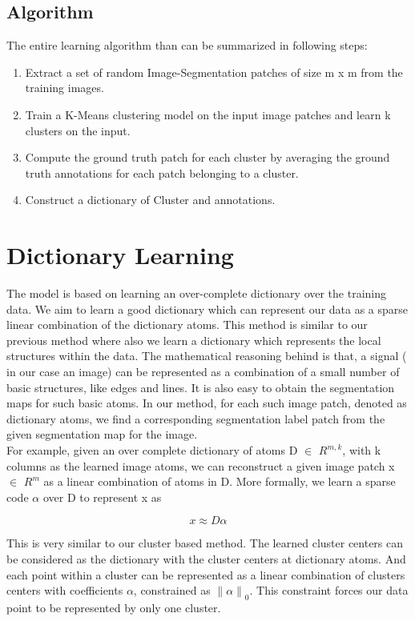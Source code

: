 \subsection{Algorithm}
The entire learning algorithm than can be summarized in following steps:
\begin{enumerate}
	\item Extract a set of random Image-Segmentation patches of size m x m from the training images.
	\item Train a K-Means clustering model on the input image patches and learn k clusters on the input.
	\item Compute the ground truth patch for each cluster by averaging the ground truth annotations for each patch belonging to a cluster. 
	\item Construct a dictionary of Cluster and annotations.
\end{enumerate}


\section{Dictionary Learning}
The model is based on learning an over-complete dictionary over the training data. We aim to learn a good dictionary which can represent our data as a sparse linear combination of the dictionary atoms.
This method is similar to our previous method where also we learn a dictionary which represents the local structures within the data. The mathematical reasoning behind is that, a signal ( in our case an image) can be represented as a combination of a small number of basic structures, like edges and lines.
It is also easy to obtain the segmentation maps for such basic atoms. In our method, for each such image patch, denoted as dictionary atoms, we find a corresponding segmentation label patch from the given segmentation map for the image.\\

For example, given an over complete dictionary of atoms D $\in$ $R^{m,k}$, with k columns as the learned image atoms, we can reconstruct a given image patch x $\in$ $R^m$ as a linear combination of atoms in D. More formally, we learn a sparse code $\alpha$ over D to represent x as

$$ x \approx D \alpha $$  

This is very similar to our cluster based method. The learned cluster centers can be considered as the dictionary with the cluster centers at dictionary atoms. And each point within a cluster can be represented as a linear combination of clusters centers with coefficients $\alpha$, constrained as ${\lVert \alpha \rVert}_0$. This constraint forces our data point to be represented by only one cluster.

